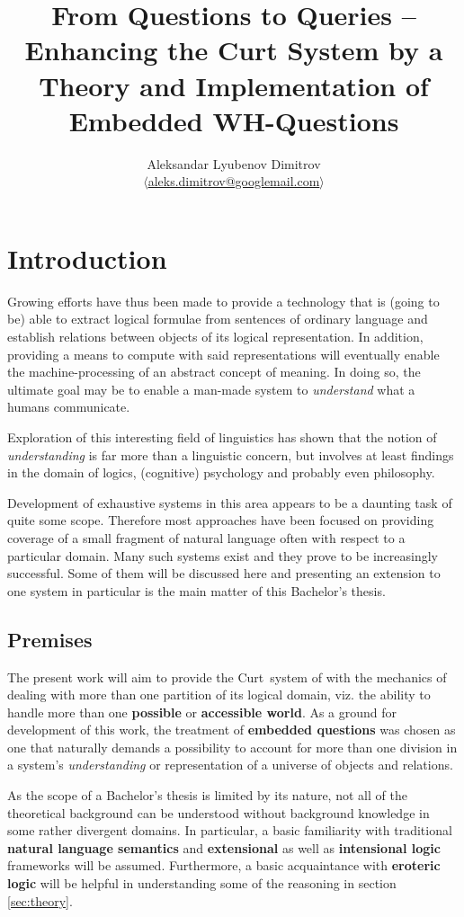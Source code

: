 \documentclass[12pt,a4paper]{article}
\author{Aleksandar Lyubenov Dimitrov\\
$\langle$\href{mailto:aleks.dimitrov@googlemail.com}{aleks.dimitrov@googlemail.com}$\rangle$}
\title{From Questions to Queries – Enhancing the Curt System by a Theory and Implementation of Embedded WH-Questions}
\newcommand{\term}[1]{\textsf{\textbf{#1}}} %
\newcommand{\pn}{\textsf} %
\newcommand{\curt}{\pn{Curt}\mbox{ }}
\theoremstyle{remark} \newtheorem*{termin}{Terminology} %
\begin{document}
\maketitle
\tableofcontents
\newpage

\section{Introduction}


Growing efforts have thus been made to provide a technology that is (going to
be) able to extract logical formulae from sentences of ordinary language and
establish relations between objects of its logical representation. In addition,
providing a means to compute with said representations will eventually enable
the machine-processing of an abstract concept of meaning. In doing so, the
ultimate goal may be to enable a man-made system to \emph{understand} what a
humans communicate.

Exploration of this  interesting field of linguistics has shown that
the notion of \emph{understanding} is far more than a linguistic concern, but
involves at least findings in the domain of logics, (cognitive) psychology and
probably even philosophy.

Development of exhaustive systems in this area appears to be a daunting task of
quite some scope. Therefore most approaches have been focused on providing
coverage of a small fragment of natural language often with respect to a
particular domain. Many such systems exist and they prove to be increasingly
successful. Some of them will be discussed here and presenting an extension to
one system in particular is the main matter of this Bachelor's thesis.

\subsection{Premises}

The present work will aim to provide the \curt system of
\cite{blackburnbos:cl1} with the mechanics of dealing with more than one
partition of its logical domain, viz. the ability to handle more than one
\term{possible} or \term{accessible world}. As a ground for development of this
work, the treatment of \term{embedded questions} was chosen as one that
naturally demands a possibility to account for more than one division in a
system's \emph{understanding} or representation of a universe of objects and
relations.

As the scope of a Bachelor's thesis is limited by its nature, not all of the
theoretical background can be understood without background knowledge in some
rather divergent domains. In particular, a basic familiarity with traditional
\term{natural language semantics} and \term{extensional} as well as
\term{intensional logic} frameworks will be assumed. Furthermore, a basic
acquaintance with \term{eroteric logic} will be helpful in understanding some of
the reasoning in section \ref{sec:theory}.
\end{document}
